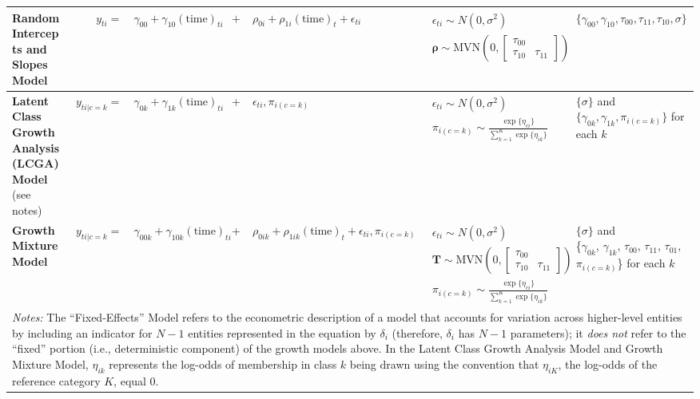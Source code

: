 \begin{table*}[!h]
\begin{tabular}{p{1.1in}rrcllp{1in}}
\raggedright\textbf{Random Intercepts and Slopes Model} & 
    $y_{ti} =$&
    $\gamma_{00} + \gamma_{10}(\text{time})_{ti} $&$+$&
    $\rho_{0i}  + \rho_{1i}(\text{time})_{t} + \epsilon_{ti}$ &
    $\begin{array}{l}\epsilon_{ti} \sim N(0, \sigma^2) \\ \mathbf{\rho} \sim \text{MVN}\left(0, \begin{bmatrix}\tau_{00} & \\ \tau_{10} & \tau_{11}\end{bmatrix}\right)\end{array}$ &
    $\{\gamma_{00}, \gamma_{10}, \tau_{00}, \tau_{11}, \tau_{10}, \sigma\}$ \\\midrule

\raggedright\textbf{Latent Class Growth Analysis (LCGA) Model} (see notes)&
    $y_{ti|c=k} =$&
    $\gamma_{0k} + \gamma_{1k}(\text{time})_{ti}$ &+&
    $\epsilon_{ti}, \pi_{i(c=k)}$ & 
    $\begin{array}{l}\epsilon_{ti} \sim N(0, \sigma^2) \\ \pi_{i(c=k)} \sim \frac{\exp\{\eta_{ci}\}}{\sum^K_{k=1}\exp\{\eta_{ik}\}}\end{array}$ &
    \multicolumn{1}{l}{\parbox[c]{1.75in}{\raggedright$\{\sigma\}$ and \\ $\{\gamma_{0k}, \gamma_{1k}, \pi_{i(c=k)}\}$ for each $k$}}\\\midrule

\raggedright\textbf{Growth Mixture Model}&
    $y_{ti|c=k} =$&
    $\gamma_{00k} + \gamma_{10k}(\text{time})_{ti}$ &+&
    $\rho_{0ik}  + \rho_{1ik}(\text{time})_{t} + \epsilon_{ti}, \pi_{i(c=k)}$ & 
    $\begin{array}{l}\epsilon_{ti} \sim N(0, \sigma^2) \\ \mathbf{T} \sim \text{MVN}\left(0, \begin{bmatrix}\tau_{00} & \\ \tau_{10} & \tau_{11}\end{bmatrix}\right)\\ \pi_{i(c=k)} \sim \frac{\exp\{\eta_{ci}\}}{\sum^K_{k=1}\exp\{\eta_{ik}\}}\end{array}$ &
    \multicolumn{1}{l}{\parbox[c]{1.75in}{\raggedright$\{\sigma\}$ and \\ \{$\gamma_{0k}$, $\gamma_{1k}$, $\tau_{00}$, $\tau_{11}$, $\tau_{01}$, $\pi_{i(c=k)}$\} for each $k$}}\\\bottomrule


\multicolumn{7}{p{\textwidth}}{\footnotesize
    \emph{Notes:} The ``Fixed-Effects'' Model refers to the econometric description of a model that accounts for variation across higher-level entities by including an indicator for $N{-}1$ entities represented in the equation by $\delta_i$ (therefore, $\delta_i$ has $N{-}1$ parameters); it \emph{does not} refer to the ``fixed'' portion (i.e., deterministic component) of the growth models above. In the Latent Class Growth Analysis Model and Growth Mixture Model, $\eta_{ik}$ represents the log-odds of membership in class $k$ being drawn using the convention that $\eta_{iK}$, the log-odds of the reference category $K$, equal 0.
}
\end{tabular}
\end{table*}
